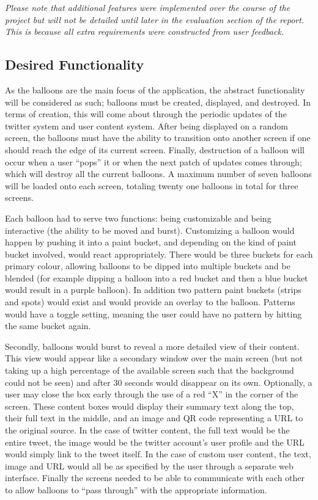 \begin{center}
\textit{Please note that additional features were implemented over the course of the project but will not be detailed until later in the evaluation section of the report. This is because all extra requirements were constructed from user feedback.}
\end{center}

\subsection{Desired Functionality}
As the balloons are the main focus of the application, the abstract functionality will be considered as such; balloons must be created, displayed, and destroyed. In terms of creation, this will come about through the periodic updates of the twitter system and user content system. After being displayed on a random screen, the balloons must have the ability to transition onto another screen if one should reach the edge of its current screen. Finally, destruction of a balloon will occur when a user ``pops'' it or when the next patch of updates comes through; which will destroy all the current balloons. A maximum number of seven balloons will be loaded onto each screen, totaling twenty one balloons in total for three screens.

Each balloon had to serve two functions: being customizable and being interactive (the ability to be moved and burst). Customizing a balloon would happen by pushing it into a paint bucket, and depending on the kind of paint bucket involved, would react appropriately. There would be three buckets for each primary colour, allowing balloons to be dipped into multiple buckets and be blended (for example dipping a balloon into a red bucket and then a blue bucket would result in a purple balloon). In addition two pattern paint buckets (strips and spots) would exist and would provide an overlay to the balloon. Patterns would have a toggle setting, meaning the user could have no pattern by hitting the same bucket again.

Secondly, balloons would burst to reveal a more detailed view of their content. This view would appear like a secondary window over the main screen (but not taking up a high percentage of the available screen such that the background could not be seen) and after 30 seconds would disappear on its own. Optionally, a user may close the box early through the use of a red ``X'' in the corner of the screen. These content boxes would display their summary text along the top, their full text in the middle, and an image and QR code representing a URL to the original source. In the case of twitter content, the full text would be the entire tweet, the image would be the twitter account's user profile and the URL would simply link to the tweet itself. In the case of custom user content, the text, image and URL would all be as specified by the user through a separate web interface. Finally the screens needed to be able to communicate with each other to allow balloons to ``pass through'' with the appropriate information.

